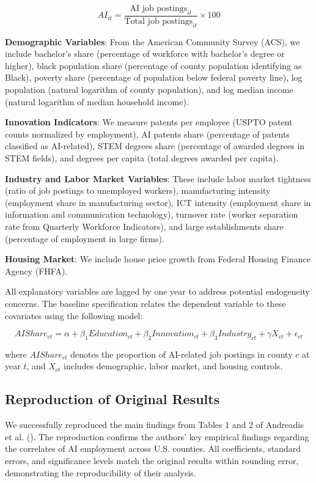 \documentclass[
]{article}
\begin{document}
\[
AI_{it} = \frac{\text{AI job postings}_{it}}{\text{Total job postings}_{it}} \times 100 \tag{1}
\]

\textbf{Demographic Variables}: From the American Community Survey
(ACS), we include bachelor's share (percentage of workforce with
bachelor's degree or higher), black population share (percentage of
county population identifying as Black), poverty share (percentage of
population below federal poverty line), log population (natural
logarithm of county population), and log median income (natural
logarithm of median household income).

\textbf{Innovation Indicators}: We measure patents per employee (USPTO
patent counts normalized by employment), AI patents share (percentage of
patents classified as AI-related), STEM degrees share (percentage of
awarded degrees in STEM fields), and degrees per capita (total degrees
awarded per capita).

\textbf{Industry and Labor Market Variables}: These include labor market
tightness (ratio of job postings to unemployed workers), manufacturing
intensity (employment share in manufacturing sector), ICT intensity
(employment share in information and communication technology), turnover
rate (worker separation rate from Quarterly Workforce Indicators), and
large establishments share (percentage of employment in large firms).

\textbf{Housing Market}: We include house price growth from Federal
Housing Finance Agency (FHFA).

All explanatory variables are lagged by one year to address potential
endogeneity concerns. The baseline specification relates the dependent
variable to these covariates using the following model:

\[
AIShare_{ct} = \alpha + \beta_1 Education_{ct} + \beta_2 Innovation_{ct} + \beta_3 Industry_{ct} + \gamma X_{ct} + \epsilon_{ct} \tag{2}
\]

where \(AIShare_{ct}\) denotes the proportion of AI-related job postings
in county \(c\) at year \(t\), and \(X_{ct}\) includes demographic,
labor market, and housing controls.

\subsection{Reproduction of Original
Results}\label{reproduction-of-original-results}

We successfully reproduced the main findings from Tables 1 and 2 of
Andreadis et al. (). The reproduction
confirms the authors' key empirical findings regarding the correlates of
AI employment across U.S. counties. All coefficients, standard errors,
and significance levels match the original results within rounding
error, demonstrating the reproducibility of their analysis.
\end{document}

